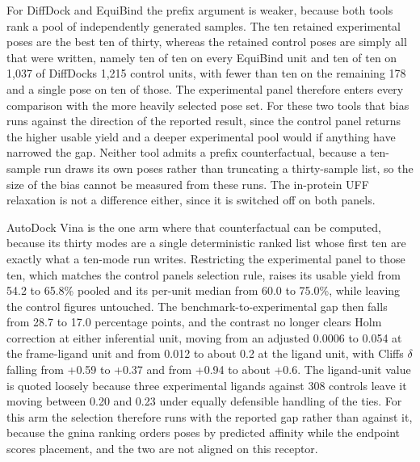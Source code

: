For DiffDock and EquiBind the prefix argument is weaker, because both tools rank a pool of independently generated samples. The ten retained experimental poses are the best ten of thirty, whereas the retained control poses are simply all that were written, namely ten of ten on every EquiBind unit and ten of ten on 1,037 of DiffDock\textquotesingle s 1,215 control units, with fewer than ten on the remaining 178 and a single pose on ten of those. The experimental panel therefore enters every comparison with the more heavily selected pose set. For these two tools that bias runs against the direction of the reported result, since the control panel returns the higher usable yield and a deeper experimental pool would if anything have narrowed the gap. Neither tool admits a prefix counterfactual, because a ten-sample run draws its own poses rather than truncating a thirty-sample list, so the size of the bias cannot be measured from these runs. The in-protein UFF relaxation is not a difference either, since it is switched off on both panels.

AutoDock Vina is the one arm where that counterfactual can be computed, because its thirty modes are a single deterministic ranked list whose first ten are exactly what a ten-mode run writes. Restricting the experimental panel to those ten, which matches the control panel\textquotesingle{}s selection rule, raises its usable yield from 54.2 to 65.8\% pooled and its per-unit median from 60.0 to 75.0\%, while leaving the control figures untouched. The benchmark-to-experimental gap then falls from 28.7 to 17.0 percentage points, and the contrast no longer clears Holm correction at either inferential unit, moving from an adjusted 0.0006 to 0.054 at the frame-ligand unit and from 0.012 to about 0.2 at the ligand unit, with Cliff\textquotesingle s \ensuremath{\delta} falling from +0.59 to +0.37 and from +0.94 to about +0.6. The ligand-unit value is quoted loosely because three experimental ligands against 308 controls leave it moving between 0.20 and 0.23 under equally defensible handling of the ties. For this arm the selection therefore runs with the reported gap rather than against it, because the gnina ranking orders poses by predicted affinity while the endpoint scores placement, and the two are not aligned on this receptor.


